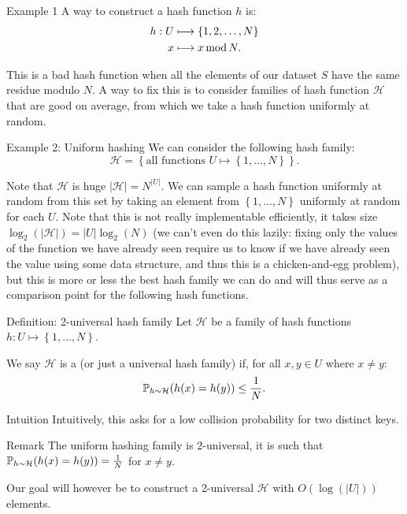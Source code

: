 \documentclass[a4paper]{article}
\begin{document}
\begin{parag}{Example 1}
    A way to construct a hash function $h$ is: 
    \[\begin{split}
    h: U &\longmapsto \left\{1, 2, \ldots, N\right\} \\
    x &\longmapsto x \Mod N.
    \end{split}\]
    
    This is a bad hash function when all the elements of our dataset $S$ have the same residue modulo $N$. A way to fix this is to consider families of hash function $\mathcal{H}$ that are good on average, from which we take a hash function uniformly at random.
\end{parag}

\begin{parag}{Example 2: Uniform hashing}
    We can consider the following hash family: 
    \[\mathcal{H} = \left\{\text{all functions $U \mapsto \left\{1, \ldots, N\right\}$}\right\}.\]

    Note that $\mathcal{H}$ is huge $\left|\mathcal{H}\right| = N^{\left|U\right|}$. We can sample a hash function uniformly at random from this set by taking an element from $\left\{1, \ldots, N\right\}$ uniformly at random for each $U$. Note that this is not really implementable efficiently, it takes size $\log_2\left(\left|\mathcal{H}\right|\right) = \left|U\right|\log_2\left(N\right)$ (we can't even do this lazily: fixing only the values of the function we have already seen require us to know if we have already seen the value using some data structure, and thus this is a chicken-and-egg problem), but this is more or less the best hash family we can do and will thus serve as a comparison point for the following hash functions.
\end{parag}

\begin{parag}{Definition: 2-universal hash family}
    Let $\mathcal{H}$ be a family of hash functions $h: U \mapsto \left\{1, \ldots, N\right\}$.

    We say $\mathcal{H}$ is a  (or just a universal hash family) if, for all $x, y \in U$ where $x \neq y$: 
    \[\prob_{h \followsdistr \mathcal{H}}\left(h\left(x\right) = h\left(y\right)\right) \leq \frac{1}{N}.\]

    \begin{subparag}{Intuition}
        Intuitively, this asks for a low collision probability for two distinct keys.
    \end{subparag}

    \begin{subparag}{Remark}
        The uniform hashing family is 2-universal, it is such that $\prob_{h \followsdistr \mathcal{H}}\left(h\left(x\right) = h\left(y\right)\right) = \frac{1}{N}$ for $x \neq y$.

        Our goal will however be to construct a 2-universal $\mathcal{H}$ with $O\left(\log\left(\left|U\right|\right)\right)$ elements.
    \end{subparag}
\end{parag}
\end{document}
